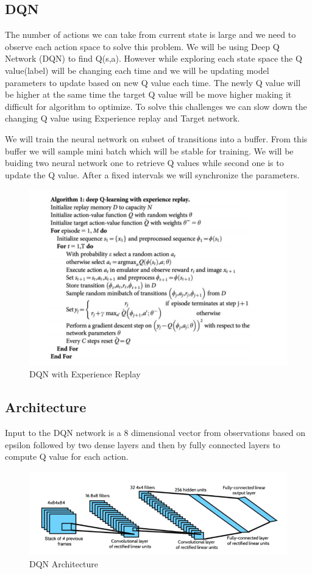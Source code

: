 \subsection{DQN}
The number of actions we can take from current state is large and we need to observe each action space to solve this problem. We will be using Deep Q Network (DQN) to find Q(s,a). However while exploring each state space the Q value(label) will be changing each time and we will be updating model parameters to update based on new Q value each time. The newly Q value will be higher at the same time the target Q value will be move higher making it difficult for algorithm to optimize. To solve this challenges we can slow down the changing Q value using Experience replay and Target network.

We will train the neural network on subset of transitions into a buffer. From this buffer we will sample mini batch which will be stable for training. We will be buiding two neural network one to retrieve Q values while second one is to update the Q value. After a fixed intervals we will synchronize the parameters. 

\begin{figure}%
\centering
\includegraphics[width=0.6\columnwidth]{figures/DQN-ExperinceReplay.png}%
\caption{DQN with Experience Replay}%
\label{fig:datastats}%
\end{figure}



\subsection{Architecture}

Input to the DQN network is a 8 dimensional vector from observations based on epsilon followed by two dense layers and then by fully connected layers to compute Q value for each action.

\begin{figure}%
\centering
\includegraphics[width=0.6\columnwidth]{figures/DQN-architecture.png}%
\caption{DQN Architecture}%
\label{fig:datastats}%
\end{figure}




